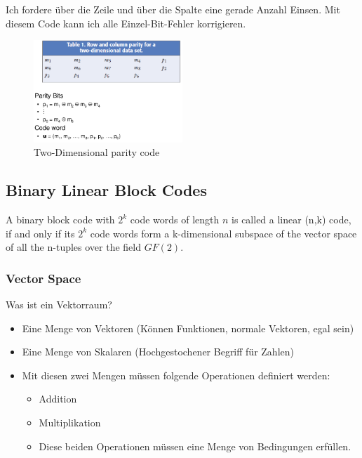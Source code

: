 Ich fordere über die Zeile und über die Spalte eine gerade Anzahl
Einsen. Mit diesem Code kann ich alle Einzel-Bit-Fehler korrigieren.

\begin{figure}[H]
\centering
\includegraphics[width=0.5\textwidth]{figures/twoDimensionalParityCode.png}
\caption{Two-Dimensional parity code}
\end{figure}

\hypertarget{binary-linear-block-codes}{%
\subsection{Binary Linear Block Codes}\label{binary-linear-block-codes}}

\begin{tcolorbox}[colback=red!5!white,colframe=red!75!black]
A binary block code with $2^k$ code words of length $n$ is called a linear (n,k) code, if and only if its $2^k$ code words form a k-dimensional subspace of the vector space of all the n-tuples over the field $GF(2)$.
\end{tcolorbox}

\hypertarget{vector-space}{%
\subsubsection{Vector Space}\label{vector-space}}

Was ist ein Vektorraum?

\begin{itemize}
\tightlist
\item
  Eine Menge von Vektoren (Können Funktionen, normale Vektoren, egal
  sein)
\item
  Eine Menge von Skalaren (Hochgestochener Begriff für Zahlen)
\item
  Mit diesen zwei Mengen müssen folgende Operationen definiert werden:
  \begin{itemize}
  \tightlist
  \item
    Addition
  \item
    Multiplikation
  \item
    Diese beiden Operationen müssen eine Menge von Bedingungen erfüllen.
  \end{itemize}
\end{itemize}

